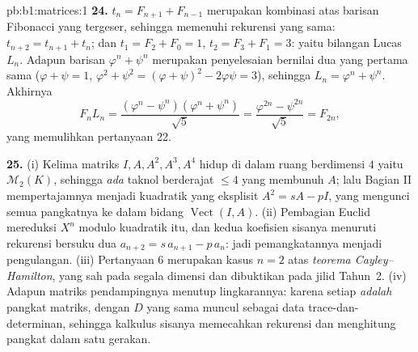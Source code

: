 \begin{solution}{pb:b1:matrices:1}
\textbf{24.} $t_n = F_{n+1} + F_{n-1}$ merupakan kombinasi atas
barisan Fibonacci yang tergeser, sehingga memenuhi
rekurensi yang sama: $t_{n+2} = t_{n+1} + t_n$; dan $t_1 = F_2 + F_0 =
1$, $t_2 = F_3 + F_1 = 3$: yaitu bilangan Lucas $L_n$.
Adapun barisan $\varphi^n + \psi^n$ merupakan penyelesaian bernilai
dua yang pertama sama ($\varphi + \psi = 1$, $\varphi^2 + \psi^2 = (
\varphi + \psi)^2 - 2\varphi\psi = 3$), sehingga $L_n = \varphi^n +
\psi^n$. Akhirnya
\[
F_n L_n = \frac{(\varphi^n - \psi^n)(\varphi^n +
\psi^n)}{\sqrt5} = \frac{\varphi^{2n} - \psi^{2n}}{\sqrt5} =
F_{2n},
\]
yang memulihkan pertanyaan 22.

\textbf{25.} (i) Kelima matriks $I, A, A^2, A^3, A^4$ hidup di
dalam ruang berdimensi $4$ yaitu $\mathcal{M}_2(K)$, sehingga \emph{ada}
 taknol berderajat $\leq 4$ yang membunuh $A$; lalu Bagian II mempertajamnya
menjadi kuadratik yang eksplisit $A^2 = sA - pI$, yang mengunci semua
pangkatnya ke dalam bidang $\operatorname{Vect}(I, A)$. (ii)
Pembagian Euclid mereduksi $X^n$ modulo kuadratik itu, dan
kedua koefisien sisanya menuruti rekurensi bersuku dua
$a_{n+2} = s\,a_{n+1} - p\,a_n$: jadi pemangkatannya menjadi
pengulangan. (iii) Pertanyaan 6 merupakan kasus $n = 2$ atas
\emph{teorema Cayley--Hamilton}, yang sah pada segala dimensi dan
dibuktikan pada jilid Tahun~2. (iv) Adapun matriks pendampingnya menutup
lingkarannya: karena setiap  \emph{adalah} pangkat matriks, dengan
 $D$ yang sama muncul sebagai data trace-dan-determinan,
sehingga kalkulus sisanya memecahkan rekurensi dan menghitung pangkat
dalam satu gerakan.

\end{solution}
